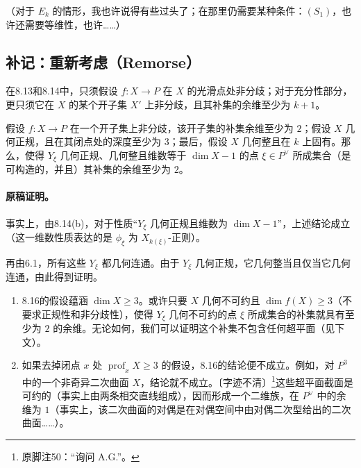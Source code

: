 （对于 $E_k$ 的情形，我也许说得有些过头了；在那里仍需要某种条件：$(S_1)$，也许还需要等维性，也许……）
\subsection*{补记：重新考虑（Remorse）}
在8.13和8.14中，只须假设 $f\colon X\to P$ 在 $X$ 的光滑点处非分歧；对于充分性部分，更只须它在 $X$ 的某个开子集 $X'$ 上非分歧，且其补集的余维至少为 $k+1$。

假设 $f\colon X\to P$ 在一个开子集上非分歧，该开子集的补集余维至少为 $2$；假设 $X$ 几何正规，且在其闭点处的深度至少为 $3$；最后，假设 $X$ 几何整且在 $k$ 上固有。那么，使得 $Y_\xi$ 几何正规、几何整且维数等于 $\dim X-1$ 的点 $\xi\in P^\vee$ 所成集合（是可构造的，并且）其补集的余维至少为 $2$。

\paragraph{原稿证明。}
事实上，由8.14(b)，对于性质“$Y_\xi$ 几何正规且维数为 $\dim X-1$”，上述结论成立（这一维数性质表达的是 $\phi_\xi$ 为 $X_{k(\xi)}$-正则）。

再由6.1，所有这些 $Y_\xi$ 都几何连通。由于 $Y_\xi$ 几何正规，它几何整当且仅当它几何连通，由此得到证明。
\begin{enumerate}
\item[(a)] 8.16的假设蕴涵 $\dim X\ge3$。或许只要 $X$ 几何不可约且 $\dim f(X)\ge3$（不要求正规性和非分歧性），使得 $Y_\xi$ 几何不可约的点 $\xi$ 所成集合的补集就具有至少为 $2$ 的余维。无论如何，我们可以证明这个补集不包含任何超平面（见下文）。
\item[(b)] 如果去掉闭点 $x$ 处 $\operatorname{prof}_xX\ge3$ 的假设，8.16的结论便不成立。例如，对 $P^3$ 中的一个非奇异二次曲面 $X$，结论就不成立。〔字迹不清〕\footnote{原脚注50：“询问 A.G.”。}这些超平面截面是可约的（事实上由两条相交直线组成），因而形成一个二维族，在 $P^\vee$ 中的余维为 $1$（事实上，该二次曲面的对偶是在对偶空间中由对偶二次型给出的二次曲面……）。
\end{enumerate}

